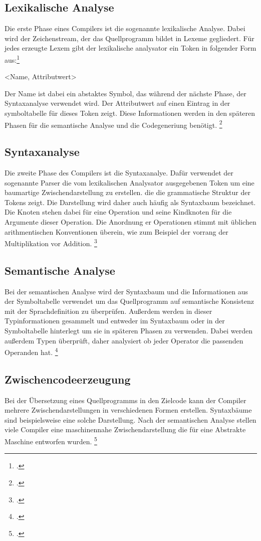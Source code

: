 \subsection{Lexikalische Analyse}
Die erste Phase eines Compilers ist die sogenannte lexikalische Analyse. Dabei wird der Zeichenstream, der das Quellprogramm bildet in Lexeme gegliedert. Für jedes erzeugte Lexem gibt der lexikalische analysator ein Token in folgender Form aus:\footcite[Vgl.][S. 7f]{Ullmann2008}
\begin{center}
 <Name, Attributwert>
\end{center}
Der Name ist dabei ein abstaktes Symbol, das während der nächste Phase, der Syntaxanalyse verwendet wird. Der Attributwert auf einen Eintrag in der symboltabelle für dieses Token zeigt. Diese Informationen werden in den späteren Phasen für die semantische Analyse und die Codegeneriung benötigt. \footcite[Vgl.][S. 7f]{Ullmann2008}
\subsection{Syntaxanalyse}
Die zweite Phase des Compilers ist die Syntaxanalye. Dafür verwendet der sogenannte Parser die vom lexikalischen Analysator ausgegebenen Token um eine baumartige Zwischendarstellung zu erstellen. die die grammatische Struktur der Tokens zeigt. Die Darstellung wird daher auch häufig als Syntaxbaum bezeichnet. Die Knoten stehen dabei für eine Operation und seine Kindknoten für die Argumente dieser Operation. Die Anordnung er Operationen stimmt mit üblichen arithmentischen Konventionen überein, wie zum Beispiel der vorrang der Multiplikation vor Addition. \footcite[Vgl.][S. 9]{Ullmann2008}
\subsection{Semantische Analyse}
Bei der semantischen Analyse wird der Syntaxbaum und die Informationen aus der Symboltabelle verwendet um das Quellprogramm auf semantische Konsistenz mit der Sprachdefinition zu überprüfen. Außerdem werden in dieser Typinformationen gesammelt und entweder im Syntaxbaum oder in der Symboltabelle hinterlegt um sie in späteren Phasen zu verwenden. Dabei werden außerdem Typen überprüft, daher analysiert ob jeder Operator die passenden Operanden hat. \footcite[Vgl.][S. 9ff]{Ullmann2008}
\subsection{Zwischencodeerzeugung}
Bei der Übersetzung eines Quellprogramms in den Zielcode kann der Compiler mehrere Zwischendarstellungen in verschiedenen Formen erstellen. Syntaxbäume sind beispielsweise eine solche Darstellung. Nach der semantischen Analyse stellen viele Compiler eine maschinennahe Zwischendarstellung die für eine Abstrakte Maschine entworfen wurden.  \footcite[Vgl.][S. 11]{Ullmann2008}
